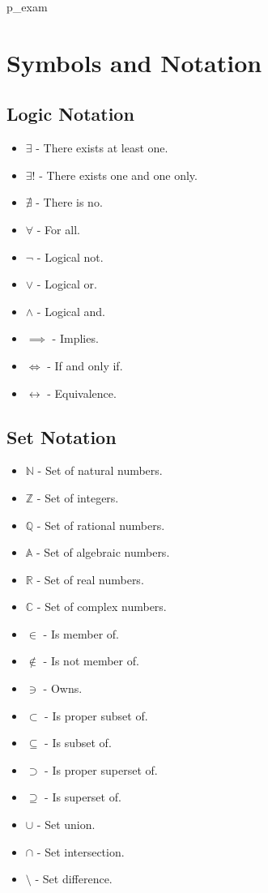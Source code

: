 \documentclass[fullpage]{article}
\newif\ifanswers
\begin{document}
\appendix
\ifanswers
\newpage
{answers}
\fi
\newpage
{p_exam}
\newpage
\section{Symbols and Notation}
\subsection*{Logic Notation}
\begin{itemize}
    \item $\exists$ - There exists at least one.
    \item $\exists!$ - There exists one and one only.
    \item $\nexists$ - There is no.
    \item $\forall$ - For all.
    \item $\neg$ - Logical not.
    \item $\lor$ - Logical or.
    \item $\land$ - Logical and.
    \item $\implies$ - Implies.
    \item $\iff$ - If and only if.
    \item $\leftrightarrow$ - Equivalence.
\end{itemize}
\subsection*{Set Notation}
\begin{itemize}
    \item $\mathbb{N}$ - Set of natural numbers.
    \item $\mathbb{Z}$ - Set of integers.
    \item $\mathbb{Q}$ - Set of rational numbers.
    \item $\mathbb{A}$ - Set of algebraic numbers.
    \item $\mathbb{R}$ - Set of real numbers.
    \item $\mathbb{C}$ - Set of complex numbers.
    \item $\in$ - Is member of.
    \item $\notin$ - Is not member of.
    \item $\ni$ - Owns.
    \item $\subset$ - Is proper subset of.
    \item $\subseteq$ - Is subset of.
    \item $\supset$ - Is proper superset of.
    \item $\supseteq$ - Is superset of.
    \item $\cup$ - Set union.
    \item $\cap$ - Set intersection.
    \item $\setminus$ - Set difference.
\end{itemize}
\end{document}

